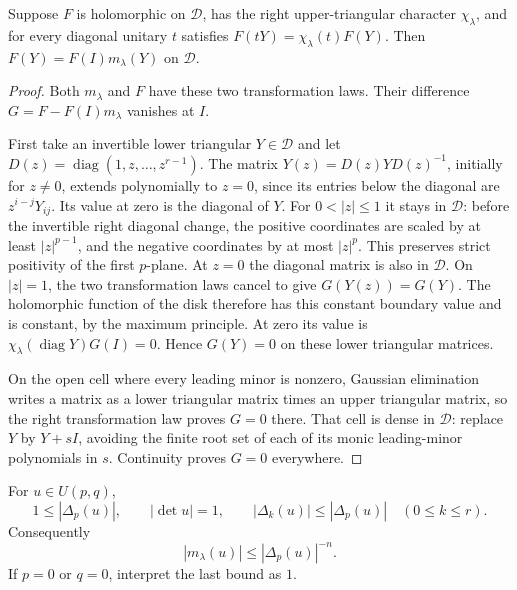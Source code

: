 \begin{srlemma}
\label{lem:sr-frame-lowest-unique}
Suppose \(F\) is holomorphic on \(\mathcal D\), has the right
upper-triangular character \(\chi_\lambda\), and for every
diagonal unitary \(t\) satisfies
\(F(tY)=\chi_\lambda(t)F(Y)\).
Then \(F(Y)=F(I)m_\lambda(Y)\) on \(\mathcal D\).
\end{srlemma}

\begin{proof}
Both \(m_\lambda\) and \(F\) have these two transformation laws.
Their difference \(G=F-F(I)m_\lambda\) vanishes at \(I\).

First take an invertible lower triangular \(Y\in\mathcal D\) and
let \(D(z)=\operatorname{diag}(1,z,\ldots,z^{r-1})\).
The matrix
\(Y(z)=D(z)YD(z)^{-1}\), initially for \(z\ne0\), extends
polynomially to \(z=0\), since its entries below the diagonal
are \(z^{i-j}Y_{ij}\).  Its value at zero is the diagonal of \(Y\).
For \(0<|z|\le1\) it stays in \(\mathcal D\):
before the invertible right diagonal change, the positive
coordinates are scaled by at least \(|z|^{p-1}\), and the
negative coordinates by at most \(|z|^p\).
This preserves strict positivity of the first \(p\)-plane.
At \(z=0\) the diagonal matrix is also in \(\mathcal D\).
On \(|z|=1\), the two transformation laws cancel to give
\(G(Y(z))=G(Y)\).
The holomorphic function of the disk therefore has this constant
boundary value and is constant, by the maximum principle.
At zero its value is
\(\chi_\lambda(\operatorname{diag}Y)G(I)=0\).
Hence \(G(Y)=0\) on these lower triangular matrices.

On the open cell where every leading minor is nonzero,
Gaussian elimination writes a matrix as a lower triangular
matrix times an upper triangular matrix, so the right
transformation law proves \(G=0\) there.
That cell is dense in \(\mathcal D\):
replace \(Y\) by \(Y+sI\), avoiding the finite root set of each
of its monic leading-minor polynomials in \(s\).
Continuity proves \(G=0\) everywhere.
\end{proof}

\begin{srlemma}
\label{lem:sr-unitary-minors}
For \(u\in U(p,q)\),
\[
 1\le|\Delta_p(u)|,\qquad |\det u|=1,\qquad
 |\Delta_k(u)|\le|\Delta_p(u)|\quad(0\le k\le r).
\]
Consequently
\begin{equation}\label{eq:sr-frame-kernel-decay}
 |m_\lambda(u)|\le|\Delta_p(u)|^{-n}.
\end{equation}
If \(p=0\) or \(q=0\), interpret the last bound as \(1\).
\end{srlemma}

